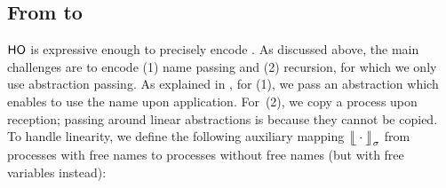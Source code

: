 \documentclass[runningheads]{llncs}
\begin{document}
{{


\subsection{From \HOp to \HO}
\label{subsec:HOpi_to_HO}
$\mathsf{HO}$ is expressive enough to
precisely encode \HOp.
As discussed above, the main challenges are to encode (1) name passing 
and (2) recursion, 
for which 
we only use  abstraction passing. 
 As explained in , for (1), we pass  
an %
abstraction which enables to use the name upon application. 
For~(2), we 
copy a process upon reception; passing around linear abstractions
is  
because 
they cannot be copied.
To handle linearity, we define the following auxiliary 
 mapping 
$\big\lfloor\!\!\big\lfloor\cdot\big\rfloor\!\!\big\rfloor^{}_\sigma$
from processes with free names to processes without free
names (but with free variables instead):

}}
\end{document}
